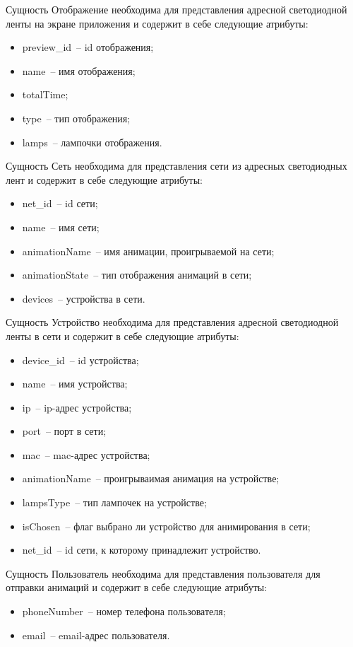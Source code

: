 Сущность Отображение необходима для представления адресной светодиодной ленты на экране приложения и содержит в себе следующие атрибуты:
\begin{itemize}
	\item preview\_id~-- id отображения;
	\item name~-- имя отображения;
	\item totalTime;
	\item type~-- тип отображения;
	\item lamps~-- лампочки отображения.
\end{itemize}

Сущность Сеть необходима для представления сети из адресных светодиодных лент и содержит в себе следующие атрибуты:
\begin{itemize}
	\item net\_id~-- id сети;
	\item name~-- имя сети;
	\item animationName~-- имя анимации, проигрываемой на сети;
	\item animationState~-- тип отображения анимаций в сети;
	\item devices~-- устройства в сети.
\end{itemize}

Сущность Устройство необходима для представления адресной светодиодной ленты в сети и содержит в себе следующие атрибуты:
\begin{itemize}
	\item device\_id~-- id устройства;
	\item name~-- имя устройства;
	\item ip~-- ip-адрес устройства;
	\item port~-- порт в сети;
	\item mac~-- mac-адрес устройства;
	\item animationName~-- проигрываимая анимация на устройстве;
	\item lampsType~-- тип лампочек на устройстве;
	\item isChosen~-- флаг выбрано ли устройство для анимирования в сети;
	\item net\_id~-- id сети, к которому принадлежит устройство.
\end{itemize}

Сущность Пользователь необходима для представления пользователя для отправки анимаций и содержит в себе следующие атрибуты:
\begin{itemize}
	\item phoneNumber~-- номер телефона пользователя;
	\item email~-- email-адрес пользователя.
\end{itemize}